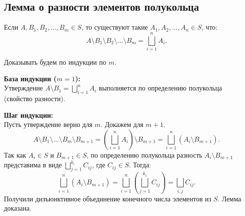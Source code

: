 \subsection{Лемма о разности элементов полукольца}

\begin{lemma}
    Если $A, B_1, B_2, \dots, B_m \in S$, то существуют такие $A_1, A_2, \dots, A_n \in S$, что:
    \[
        A \setminus B_1 \setminus B_2 \setminus \dots \setminus B_m = \bigsqcup_{i=1}^{n} A_i.
    \]
\end{lemma}

\begin{Proof}
    Доказывать будем по индукции по $m$. %
    
    \textbf{База индукции ($m=1$):} \\
    Утверждение $A \setminus B_1 = \bigsqcup_{i=1}^{n} A_i$ выполняется по определению полукольца (свойство разности). %

    \textbf{Шаг индукции:} \\
    Пусть утверждение верно для $m$. Докажем для $m+1$. %
    \[
        A \setminus B_1 \setminus \dots \setminus B_m \setminus B_{m+1} = \left( \bigsqcup_{i=1}^{n} A_i \right) \setminus B_{m+1} = \bigsqcup_{i=1}^{n} (A_i \setminus B_{m+1}).
    \]
    Так как $A_i \in S$ и $B_{m+1} \in S$, по определению полукольца разность $A_i \setminus B_{m+1}$ представима в виде $\bigsqcup_{j=1}^{k_i} C_{ij}$, где $C_{ij} \in S$. %
    Тогда:
    \[
        \bigsqcup_{i=1}^{n} (A_i \setminus B_{m+1}) = \bigsqcup_{i=1}^{n} \left( \bigsqcup_{j=1}^{k_i} C_{ij} \right) = \bigsqcup_{i, j} C_{ij}.
    \]
    Получили дизъюнктивное объединение конечного числа элементов из $S$. Лемма доказана. %
\end{Proof}

